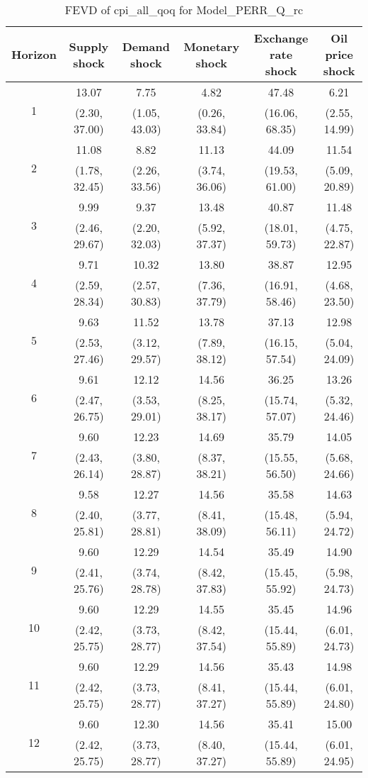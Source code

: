 \documentclass{article}
\begin{document}
\begin{table}
	\footnotesize
	\caption{FEVD of cpi_all_qoq for Model_PERR_Q_rc}
	\begin{tabular}{cccccc}
		Horizon & Supply shock & Demand shock & Monetary shock & Exchange rate shock & Oil price shock\\ \hline
		\multirow{2}{*}{1} & 13.07 & 7.75 & 4.82 & 47.48 & 6.21\\
		 & (2.30, 37.00) & (1.05, 43.03) & (0.26, 33.84) & (16.06, 68.35) & (2.55, 14.99)\\
		\multirow{2}{*}{2} & 11.08 & 8.82 & 11.13 & 44.09 & 11.54\\
		 & (1.78, 32.45) & (2.26, 33.56) & (3.74, 36.06) & (19.53, 61.00) & (5.09, 20.89)\\
		\multirow{2}{*}{3} & 9.99 & 9.37 & 13.48 & 40.87 & 11.48\\
		 & (2.46, 29.67) & (2.20, 32.03) & (5.92, 37.37) & (18.01, 59.73) & (4.75, 22.87)\\
		\multirow{2}{*}{4} & 9.71 & 10.32 & 13.80 & 38.87 & 12.95\\
		 & (2.59, 28.34) & (2.57, 30.83) & (7.36, 37.79) & (16.91, 58.46) & (4.68, 23.50)\\
		\multirow{2}{*}{5} & 9.63 & 11.52 & 13.78 & 37.13 & 12.98\\
		 & (2.53, 27.46) & (3.12, 29.57) & (7.89, 38.12) & (16.15, 57.54) & (5.04, 24.09)\\
		\multirow{2}{*}{6} & 9.61 & 12.12 & 14.56 & 36.25 & 13.26\\
		 & (2.47, 26.75) & (3.53, 29.01) & (8.25, 38.17) & (15.74, 57.07) & (5.32, 24.46)\\
		\multirow{2}{*}{7} & 9.60 & 12.23 & 14.69 & 35.79 & 14.05\\
		 & (2.43, 26.14) & (3.80, 28.87) & (8.37, 38.21) & (15.55, 56.50) & (5.68, 24.66)\\
		\multirow{2}{*}{8} & 9.58 & 12.27 & 14.56 & 35.58 & 14.63\\
		 & (2.40, 25.81) & (3.77, 28.81) & (8.41, 38.09) & (15.48, 56.11) & (5.94, 24.72)\\
		\multirow{2}{*}{9} & 9.60 & 12.29 & 14.54 & 35.49 & 14.90\\
		 & (2.41, 25.76) & (3.74, 28.78) & (8.42, 37.83) & (15.45, 55.92) & (5.98, 24.73)\\
		\multirow{2}{*}{10} & 9.60 & 12.29 & 14.55 & 35.45 & 14.96\\
		 & (2.42, 25.75) & (3.73, 28.77) & (8.42, 37.54) & (15.44, 55.89) & (6.01, 24.73)\\
		\multirow{2}{*}{11} & 9.60 & 12.29 & 14.56 & 35.43 & 14.98\\
		 & (2.42, 25.75) & (3.73, 28.77) & (8.41, 37.27) & (15.44, 55.89) & (6.01, 24.80)\\
		\multirow{2}{*}{12} & 9.60 & 12.30 & 14.56 & 35.41 & 15.00\\
		 & (2.42, 25.75) & (3.73, 28.77) & (8.40, 37.27) & (15.44, 55.89) & (6.01, 24.95)\\
	\end{tabular}
\label{tab:fevd-Model_PERR_Q_rc-cpi_all_qoq}
\end{table}
\end{document}
